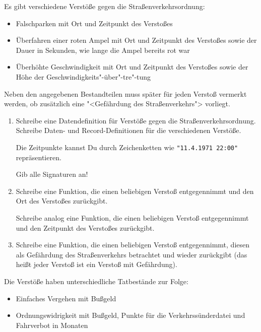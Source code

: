 \begin{aufgabe}

  Es gibt verschiedene Verstöße gegen die
  Straßenverkehrsordnung: 
  \begin{itemize}
  \item Falschparken mit Ort und Zeitpunkt des Verstoßes

  \item Überfahren einer roten Ampel mit Ort und Zeitpunkt des Verstoßes
    sowie der Dauer in Sekunden, wie lange die Ampel bereits rot war

  \item Überhöhte Geschwindigkeit mit Ort und Zeitpunkt des Verstoßes
    sowie der Höhe der Geschwindigkeits"-über"-tre"-tung
  \end{itemize}
  Neben den angegebenen Bestandteilen muss später für jeden Verstoß vermerkt 
  werden, ob zusätzlich eine "<Gefährdung des Straßenverkehrs"> vorliegt.
  
  \begin{enumerate}
  \item Schreibe eine Datendefinition für
    Verstöße gegen die Straßenverkehrsordnung.  Schreibe Daten-
    und Record-Definitionen für die verschiedenen Verstöße.  

    Die Zeitpunkte kannst Du durch Zeichenketten wie \verb|"11.4.1971 22:00"| repräsentieren.  

    Gib alle Signaturen an!

  \item Schreibe eine Funktion, die einen
    beliebigen Verstoß entgegennimmt und den Ort des Verstoßes
    zurückgibt.

    Schreibe analog eine Funktion, die einen
    beliebigen Verstoß entgegennimmt und den Zeitpunkt des Verstoßes
    zurückgibt.

  \item Schreibe eine Funktion, die einen
    beliebigen Verstoß entgegennimmt, diesen als Gefährdung des
    Straßenverkehrs betrachtet und wieder zurückgibt (das heißt jeder 
    Verstoß ist ein Verstoß mit Gefährdung).
  \end{enumerate}

  Die Verstöße haben unterschiedliche Tatbestände zur Folge:

  \begin{itemize}
  \item Einfaches Vergehen mit Bußgeld

  \item Ordnungswidrigkeit mit Bußgeld, Punkte für die
    Verkehrssünderdatei und Fahrverbot in Monaten


\end{itemize}
\end{aufgabe}
